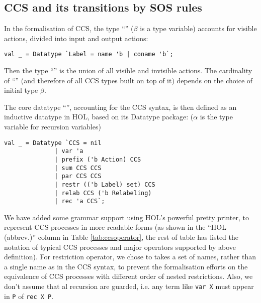 
\subsection{CCS and its transitions by SOS rules}

In the formalisation of CCS, 
the type ``'' ($\beta$ is a
type variable) accounts for visible actions, divided into input
and output actions:
\begin{lstlisting}
val _ = Datatype `Label = name 'b | coname 'b`;
\end{lstlisting}
Then
the type ``'' is the
union of all visible and invisible actions. The cardinality of
``'' (and therefore of all
CCS types built on top of it) 
 depends on the choice of initial  type $\beta$.

The core datatype ``'', accounting for the CCS syntax, is then defined as an inductive
datatype in HOL, based on its Datatype package: ($\alpha$ is the type
variable for recursion variables) 
\begin{lstlisting}
val _ = Datatype `CCS = nil
		      | var 'a
		      | prefix ('b Action) CCS
		      | sum CCS CCS
		      | par CCS CCS
		      | restr (('b Label) set) CCS
		      | relab CCS ('b Relabeling)
		      | rec 'a CCS`;
\end{lstlisting}

We have added some  grammar support using HOL's powerful pretty printer, to represent CCS
processes in more readable forms (as shown in the ``HOL (abbrev.)''
column in Table \ref{tab:ccsoperator}, the rest of table has listed the notation of typical CCS processes and
major operators supported by above definition). For restriction
operator, we chose to takes a set of names, rather than a
  single name as in the  CCS syntax, to prevent the formalisation
  efforts on the equivalence of CCS processes with different order of
  nested restrictions. Also, we don't assume that al recursion are
  guarded, i.e. any term like \texttt{var X} must appear in \texttt{P} of \texttt{rec X P}.

